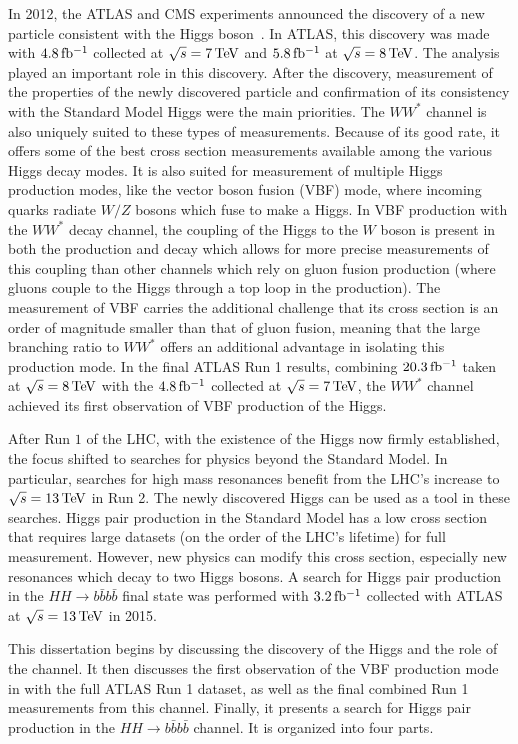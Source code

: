 In 2012, the ATLAS and CMS experiments announced the discovery of a new particle consistent with the Higgs boson~\cite{Discovery,CMSDiscovery}. In ATLAS, this discovery was made with $4.8 \mbox{\,fb$^{-1}$}$ collected at $\sqrt{s} = 7 \TeV$ and $5.8 \mbox{\,fb$^{-1}$}$ at $\sqrt{s} = 8 \TeV$. The \HWWfull analysis played an important role in this discovery. After the discovery, measurement of the properties of the newly discovered particle and confirmation of its consistency with the Standard Model Higgs were the main priorities. The $WW^*$ channel is also uniquely suited to these types of measurements. Because of its good rate, it offers some of the best cross section measurements available among the various Higgs decay modes. It is also suited for measurement of multiple Higgs production modes, like the vector boson fusion (VBF) mode, where incoming quarks radiate $W/Z$ bosons which fuse to make a Higgs. In VBF production with the $WW^*$ decay channel, the coupling of the Higgs to the $W$ boson is present in both the production and decay which allows for more precise measurements of this coupling than other channels which rely on gluon fusion production (where gluons couple to the Higgs through a top loop in the production). The measurement of VBF carries the additional challenge that its cross section is an order of magnitude smaller than that of gluon fusion, meaning that the large branching ratio to $WW^*$ offers an additional advantage in isolating this production mode. In the final ATLAS Run 1 results, combining $20.3 \mbox{\,fb$^{-1}$}$ taken at $\sqrt{s} = 8 \TeV$ with the $4.8 \mbox{\,fb$^{-1}$}$ collected at $\sqrt{s} = 7 \TeV$, the $WW^*$ channel achieved its first observation of VBF production of the Higgs.

After Run $1$ of the LHC, with the existence of the Higgs now firmly established, the focus shifted to searches for physics beyond the Standard Model. In particular, searches for high mass resonances benefit from the LHC's increase to $\sqrt{s} = 13 \TeV$ in Run 2. The newly discovered Higgs can be used as a tool in these searches. Higgs pair production in the Standard Model has a low cross section that requires large datasets (on the order of the LHC's lifetime) for full measurement. However, new physics can modify this cross section, especially new resonances which decay to two Higgs bosons. A search for Higgs pair production in the $HH\to b\bar{b}b\bar{b}$ final state was performed with $3.2 \mbox{\,fb$^{-1}$}$ collected with ATLAS at $\sqrt{s} = 13 \TeV$ in 2015. 

This dissertation begins by discussing the discovery of the Higgs and the role of the \HWWfull channel. It then discusses the first observation of the VBF production mode in \HWWfull with the full ATLAS Run 1 dataset, as well as the final combined Run 1 measurements from this channel. Finally, it presents a search for Higgs pair production in the $HH\to b\bar{b}b\bar{b}$ channel. It is organized into four parts. 

